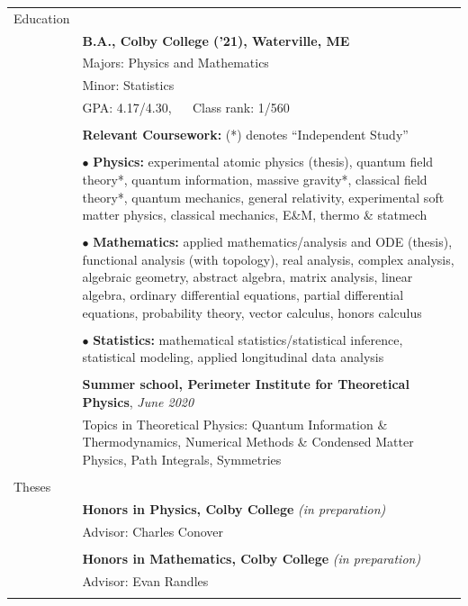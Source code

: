 \documentclass[10pt]{article}
\begin{document}
\noindent \begin{longtable}{ l p{14.7cm}   }

	
  \large{Education}    	& \\ 
  						& \textbf{B.A., Colby College ('21), Waterville, ME} \\
     				 	& Majors: Physics and Mathematics \\
     				 	& Minor: Statistics  \\
     					& GPA: 4.17/4.30, $\quad$ Class rank: 1/560 \\
	 					& \\ 

	 					
	 					& \textbf{Relevant Coursework:} (*) denotes ``Independent Study'' \\ \vspace{-12pt}
	 					& \\
	 					& $\bullet$ \textbf{Physics:} experimental atomic physics (thesis), quantum field theory*, quantum information, massive gravity*, classical field theory*, quantum mechanics,  general relativity, experimental soft matter physics, classical mechanics, E\&M, thermo \& statmech\\  \vspace{-9pt}
	 					& \\
	 					& $\bullet$ \textbf{Mathematics:} applied mathematics/analysis and ODE (thesis), functional analysis (with topology), real analysis, complex analysis, algebraic geometry, abstract algebra, matrix analysis, linear algebra, ordinary differential equations, partial differential equations, probability theory, vector calculus, honors calculus\\   \vspace{-9pt}
	 					& \\ 
	 					& $\bullet$ \textbf{Statistics:} mathematical statistics/statistical inference,  statistical modeling, applied longitudinal data analysis\\
	 					& \\
	 					
	 					
	 					&\textbf{Summer school, Perimeter Institute for Theoretical Physics}, \textit{June 2020} \\
						& Topics in Theoretical Physics: Quantum Information \& Thermodynamics, Numerical Methods \& Condensed Matter Physics, Path Integrals, Symmetries \\
						&\\
						
						
\large{Theses}
&\\
& \textbf{Honors in Physics, Colby College} \textit{(in preparation)}\\
& Advisor: Charles Conover\\
& \\
& \textbf{Honors in Mathematics, Colby College} \textit{(in preparation)}\\
& Advisor: Evan Randles\\
&\\ 
    

\end{longtable}
\end{document}
